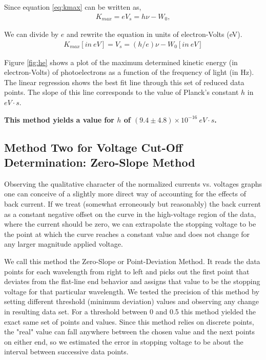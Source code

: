 \documentclass[aps,twocolumn,secnumarabic,nobalancelastpage,amsmath,amssymb,
nofootinbib]{revtex4}
\begin{document}
Since equation \ref{eq:kmax} can be written as,
\begin{align}
K_{max} = eV_s = h\nu - W_0,
\end{align}

We can divide by $e$ and rewrite the equation in units of electron-Volts (eV).
\begin{eqnarray}
\label{eq:main}
K_{max}[in ~eV] = V_s = (h/e)\nu - W_0 [in ~eV]
\end{eqnarray}



Figure \ref{fig:he} shows a plot of the maximum determined kinetic energy (in electron-Volts) of photoelectrons as a function of the frequency of light (in Hz).  The linear regression shows the best fit line through this set of reduced data points.  The slope of this line corresponds to the value of Planck's constant $h$ in $eV \cdot s$.

\vspace{0.3in}

\textbf{This method yields a value for $h$ of $(9.4 \pm 4.8) \times 10^{-16} ~eV\cdot s$.}

\subsection{Method Two for Voltage Cut-Off Determination: Zero-Slope Method}

Observing the qualitative character of the normalized currents vs. voltages graphs one can conceive of a slightly more direct way of accounting for the effects of back current.  If we treat (somewhat erroneously but reasonably) the back current as a constant negative offset on the curve in the high-voltage region of the data, where the current should be zero, we can extrapolate the stopping voltage to be the point at which the curve reaches a constant value and does not change for any larger magnitude applied voltage.

We call this method the Zero-Slope or Point-Deviation Method.  It reads the data points for each wavelength from right to left and picks out the first point that deviates from the flat-line end behavior and assigns that value to be the stopping voltage for that particular wavelength.  We tested the precision of this method by setting different threshold (minimum deviation) values and observing any change in resulting data set.  For a threshold between 0 and 0.5 this method yielded the exact same set of points and values.  Since this method relies on discrete points, the "real" value can fall anywhere between the chosen value and the next points on either end, so we estimated the error in stopping voltage to be about the interval between successive data points.
\end{document}
